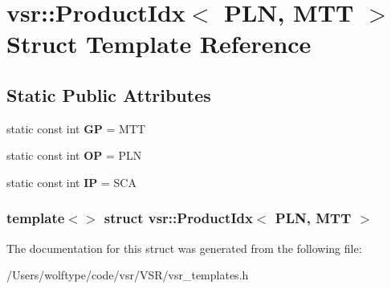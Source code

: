 \hypertarget{structvsr_1_1_product_idx_3_01_p_l_n_00_01_m_t_t_01_4}{\section{vsr\-:\-:Product\-Idx$<$ P\-L\-N, M\-T\-T $>$ Struct Template Reference}
\label{structvsr_1_1_product_idx_3_01_p_l_n_00_01_m_t_t_01_4}
}
\subsection*{Static Public Attributes}
\begin{DoxyCompactItemize}
\item 
\hypertarget{structvsr_1_1_product_idx_3_01_p_l_n_00_01_m_t_t_01_4_a8134e5e34ce00567f26054472d5cf752}{static const int {\bfseries G\-P} = M\-T\-T}\label{structvsr_1_1_product_idx_3_01_p_l_n_00_01_m_t_t_01_4_a8134e5e34ce00567f26054472d5cf752}

\item 
\hypertarget{structvsr_1_1_product_idx_3_01_p_l_n_00_01_m_t_t_01_4_a8fb219b989827a4221fbb70b08576413}{static const int {\bfseries O\-P} = P\-L\-N}\label{structvsr_1_1_product_idx_3_01_p_l_n_00_01_m_t_t_01_4_a8fb219b989827a4221fbb70b08576413}

\item 
\hypertarget{structvsr_1_1_product_idx_3_01_p_l_n_00_01_m_t_t_01_4_a63828439eea3382780df57fde8d56150}{static const int {\bfseries I\-P} = S\-C\-A}\label{structvsr_1_1_product_idx_3_01_p_l_n_00_01_m_t_t_01_4_a63828439eea3382780df57fde8d56150}

\end{DoxyCompactItemize}
\subsubsection*{template$<$$>$ struct vsr\-::\-Product\-Idx$<$ P\-L\-N, M\-T\-T $>$}



The documentation for this struct was generated from the following file\-:\begin{DoxyCompactItemize}
\item 
/\-Users/wolftype/code/vsr/\-V\-S\-R/vsr\-\_\-templates.\-h\end{DoxyCompactItemize}
